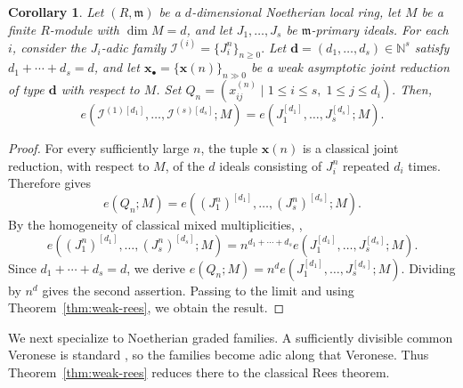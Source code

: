 \documentclass[reqno,12pt]{amsart}
\theoremstyle{plain}
\newtheorem{cor}[prop]{Corollary}
\theoremstyle{definition}
\theoremstyle{remark}
\newtheorem{rem}[prop]{Remark}
\numberwithin{equation}{section}
\begin{document}
\begin{cor}
\label{cor:weak-rees-adic}
Let $(R,\mathfrak m)$ be a $d$-dimensional Noetherian local ring, let
$M$ be a finite $R$-module with $\dim M=d$, and let
$J_1,\ldots,J_s$ be $\mathfrak m$-primary ideals. For each $i$, consider
the $J_i$-adic family $\mathcal I^{(i)}
=
\{J_i^n\}_{n\geq0}.$
Let $\mathbf d=(d_1,\ldots,d_s)\in\mathbb N^s$ satisfy
$d_1+\cdots+d_s=d$, and let
$\mathbf x_\bullet=\{\mathbf x(n)\}_{n\gg0}$ be a weak asymptotic joint
reduction of type $\mathbf d$ with respect to $M$. Set $Q_n
=
(x_{ij}^{(n)}
\mid
1\leq i\leq s,\;
1\leq j\leq d_i).$
Then, 
\[
e\!\left(
\mathcal I^{(1)[d_1]},\ldots,
\mathcal I^{(s)[d_s]};M
\right)
=
e\!\left(
J_1^{[d_1]},\ldots,J_s^{[d_s]};M
\right).
\]
\end{cor}

\begin{proof}
For every sufficiently large $n$, the tuple $\mathbf x(n)$ is a
classical joint reduction, with respect to $M$, of the $d$ ideals
consisting of $J_i^n$ repeated $d_i$ times. Therefore
\cite[Theorem~17.4.9]{SwansonHuneke} gives
\[
e(Q_n;M)
=
e\!\left(
(J_1^n)^{[d_1]},\ldots,
(J_s^n)^{[d_s]};M
\right).
\]
By the homogeneity of classical mixed multiplicities,
\cite[Theorem~17.4.2 and Definition~17.4.3]{SwansonHuneke},
\[
e\!\left(
(J_1^n)^{[d_1]},\ldots,
(J_s^n)^{[d_s]};M
\right)
=
n^{d_1+\cdots+d_s}
e\!\left(
J_1^{[d_1]},\ldots,J_s^{[d_s]};M
\right).
\]
Since $d_1+\cdots+d_s=d$, we derive $e(Q_n;M)
=
n^d
e\!\left(
J_1^{[d_1]},\ldots,J_s^{[d_s]};M
\right).$
Dividing by $n^d$ gives the second assertion. Passing to the limit and
using Theorem~\ref{thm:weak-rees}, we obtain the result.
\end{proof}


We next specialize to Noetherian graded families. A sufficiently
divisible common Veronese is standard
\cite[Theorem~2.1]{HerzogHibiTrung}, so the families become adic along
that Veronese. Thus Theorem~\ref{thm:weak-rees} reduces there to the
classical Rees theorem.
\end{document}
